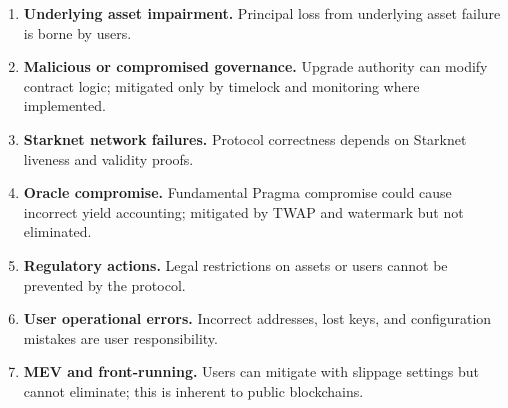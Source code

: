 \begin{enumerate}
\item \textbf{Underlying asset impairment.} Principal loss from underlying asset failure is borne by users.

\item \textbf{Malicious or compromised governance.} Upgrade authority can modify contract logic; mitigated only by timelock and monitoring where implemented.

\item \textbf{Starknet network failures.} Protocol correctness depends on Starknet liveness and validity proofs.

\item \textbf{Oracle compromise.} Fundamental Pragma compromise could cause incorrect yield accounting; mitigated by TWAP and watermark but not eliminated.

\item \textbf{Regulatory actions.} Legal restrictions on assets or users cannot be prevented by the protocol.

\item \textbf{User operational errors.} Incorrect addresses, lost keys, and configuration mistakes are user responsibility.

\item \textbf{MEV and front-running.} Users can mitigate with slippage settings but cannot eliminate; this is inherent to public blockchains.
\end{enumerate}

